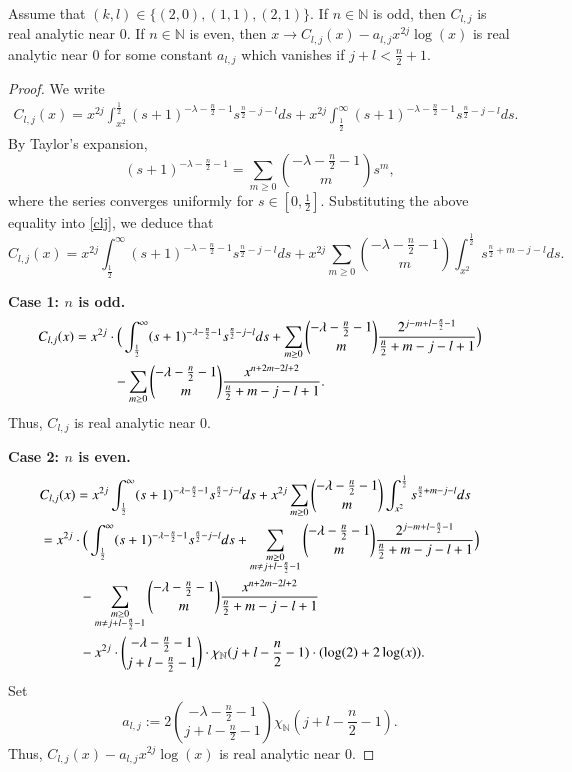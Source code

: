 \documentclass[12pt]{amsart}
\begin{document}
\begin{lemma}\label{third fkl lemma} Assume that $(k,l)\in\{(2,0),(1,1),(2,1)\}$. If $n\in\mathbb{N}$ is odd, then $C_{l,j}$ is real analytic near $0.$ If $n\in\mathbb{N}$ is even, then $x\to C_{l,j}(x)-a_{l,j}x^{2j}\log(x)$ is real analytic near $0$ for some constant $a_{l,j}$ which vanishes if $j+l<\frac{n}{2}+1.$
\end{lemma}
\begin{proof} We write
\begin{align}\label{clj}
C_{l,j}(x)=x^{2j}\int_{x^2}^{\frac12}(s+1)^{-\lambda-\frac{n}{2}-1}s^{\frac{n}{2}-j-l}ds+x^{2j}\int_{\frac12}^{\infty}(s+1)^{-\lambda-\frac{n}{2}-1}s^{\frac{n}{2}-j-l}ds.
\end{align}
By Taylor's expansion,
$$(s+1)^{-\lambda-\frac{n}{2}-1}=\sum_{m\geq0}\binom{-\lambda-\frac{n}{2}-1}{m}s^m,$$
where the series converges uniformly for $s\in[0,\frac12].$ Substituting the above equality into \eqref{clj}, we deduce that
$$C_{l,j}(x)=x^{2j}\int_{\frac12}^{\infty}(s+1)^{-\lambda-\frac{n}{2}-1}s^{\frac{n}{2}-j-l}ds+x^{2j}\sum_{m\geq0}\binom{-\lambda-\frac{n}{2}-1}{m}\int_{x^2}^{\frac12}s^{\frac{n}{2}+m-j-l}ds.$$

{\bf Case 1:  $n$ is odd.}
\begin{align*}
C_{l,j}(x)&=x^{2j}\cdot\Big( \int_{\frac12}^{\infty}(s+1)^{-\lambda-\frac{n}{2}-1}s^{\frac{n}{2}-j-l}ds+\sum_{m\geq0}\binom{-\lambda-\frac{n}{2}-1}{m}\frac{2^{j-m+l-\frac{n}{2}-1}}{\frac{n}{2}+m-j-l+1}\Big)\\
&\hspace{1.0cm}-\sum_{m\geq0}\binom{-\lambda-\frac{n}{2}-1}{m}\frac{x^{n+2m-2l+2}}{\frac{n}{2}+m-j-l+1}.
\end{align*}
Thus, $C_{l,j}$ is real analytic near $0.$

{\bf Case 2:  $n$ is even.}
\begin{align*}
&C_{l,j}(x)=x^{2j}\int_{\frac12}^{\infty}(s+1)^{-\lambda-\frac{n}{2}-1}s^{\frac{n}{2}-j-l}ds+x^{2j}\sum_{m\geq0}\binom{-\lambda-\frac{n}{2}-1}{m}\int_{x^2}^{\frac12}s^{\frac{n}{2}+m-j-l}ds\\
&=x^{2j}\cdot\Big( \int_{\frac12}^{\infty}(s+1)^{-\lambda-\frac{n}{2}-1}s^{\frac{n}{2}-j-l}ds+\sum_{\substack{m\geq0\\ m\neq j+l-\frac{n}{2}-1}}\binom{-\lambda-\frac{n}{2}-1}{m}\frac{2^{j-m+l-\frac{n}{2}-1}}{\frac{n}{2}+m-j-l+1}\Big)\\
&\hspace{1.0cm}-\sum_{\substack{m\geq0\\ m\neq j+l-\frac{n}{2}-1}}\binom{-\lambda-\frac{n}{2}-1}{m}\frac{x^{n+2m-2l+2}}{\frac{n}{2}+m-j-l+1}\\
&\hspace{1.0cm}-x^{2j}\cdot \binom{-\lambda-\frac{n}{2}-1}{j+l-\frac{n}{2}-1}\cdot\chi_{\mathbb{N}}(j+l-\frac{n}{2}-1)\cdot (\log(2)+2\log(x)).
\end{align*}
Set $$a_{l,j}:=2\binom{-\lambda-\frac{n}{2}-1}{j+l-\frac{n}{2}-1}\chi_{\mathbb{N}}(j+l-\frac{n}{2}-1).$$
Thus, $C_{l,j}(x)-a_{l,j}x^{2j}\log(x)$ is real analytic near $0.$
\end{proof}
\end{document}
